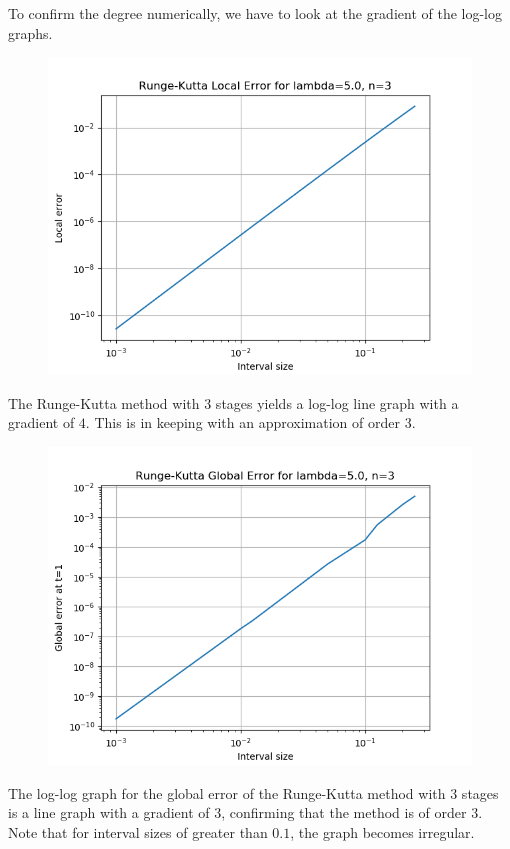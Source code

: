 \documentclass{article}
\begin{document}
To confirm the degree numerically, we have to look at the gradient of the
log-log graphs.

\begin{figure}[H]
	\includegraphics[scale=0.6]{RK3_5_loglog}
\end{figure}
The Runge-Kutta method with $3$ stages yields a log-log line graph with a
gradient of $4$.  This is in keeping with an approximation of order $3$.
\begin{figure}[H]
	\includegraphics[scale=0.6]{RK3_5_loglog_global}
\end{figure}
The log-log graph for the global error of the Runge-Kutta method with $3$
stages is a line graph with a gradient of $3$, confirming that the method is of
order $3$. Note that for interval sizes of greater than $0.1$, the graph becomes
irregular.
\end{document}
